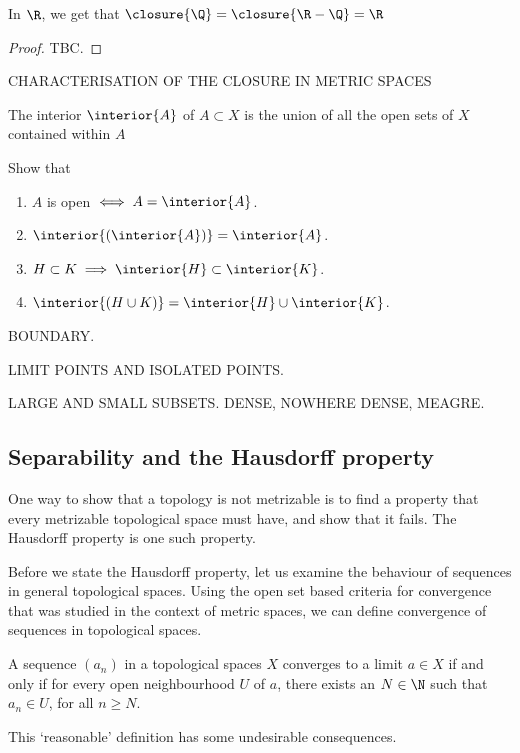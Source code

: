 \begin{ncor}
  In $\R$, we get that $\closure{\Q} = \closure{\R-\Q} = \R$
\end{ncor}
\begin{proof}
  TBC.
\end{proof}

CHARACTERISATION OF THE CLOSURE IN METRIC SPACES

\begin{ndfn}[Interior]
  The interior $\interior{A}$ of $A \subset X$ is the union of all the open sets of $X$ contained within $A$
\end{ndfn}

\begin{exercise}
Show that
\begin{enumerate}
\item $A$ is open $\iff A = \interior{A}$.
\item $\interior{(\interior{A})} = \interior{A}$.
\item $H \subset K \implies \interior{H} \subset \interior{K}$.
\item $\interior{(H \cup K)} = \interior{H} \cup \interior{K}$.
\end{enumerate}
\end{exercise}

BOUNDARY.

LIMIT POINTS AND ISOLATED POINTS.

LARGE AND SMALL SUBSETS. DENSE, NOWHERE DENSE, MEAGRE.

\subsection{Separability and the Hausdorff property}
One way to show that a topology is not metrizable is to find a property that every metrizable topological space must have, and show that it fails. The Hausdorff property is one such property.

Before we state the Hausdorff property, let us examine the behaviour of sequences in general topological spaces. Using the open set based criteria for convergence that was studied in the context of metric spaces, we can define convergence of sequences in topological spaces.
\begin{ndfn}
  A sequence $(a_n)$ in a topological spaces $X$ converges to a limit $a \in X$ if and only if for every open neighbourhood $U$ of $a$, there exists an $N \in \N$ such that $a_n \in U$, for all $n \geq N$.
\end{ndfn}
This `reasonable' definition has some undesirable consequences.

